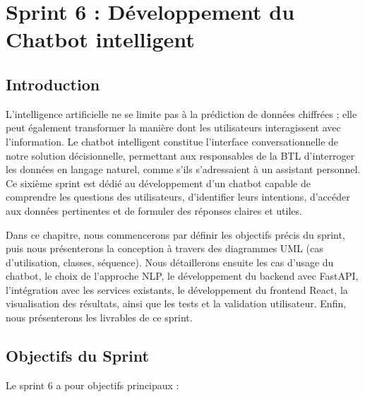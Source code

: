 \chapter{Sprint 6 : Développement du Chatbot intelligent}
\label{chap:sprint6-chatbot}

\section*{Introduction}

L'intelligence artificielle ne se limite pas à la prédiction de données chiffrées ; elle peut également transformer la manière dont les utilisateurs interagissent avec l'information. Le chatbot intelligent constitue l'interface conversationnelle de notre solution décisionnelle, permettant aux responsables de la BTL d'interroger les données en langage naturel, comme s'ils s'adressaient à un assistant personnel. Ce sixième sprint est dédié au développement d'un chatbot capable de comprendre les questions des utilisateurs, d'identifier leurs intentions, d'accéder aux données pertinentes et de formuler des réponses claires et utiles.

Dans ce chapitre, nous commencerons par définir les objectifs précis du sprint, puis nous présenterons la conception à travers des diagrammes UML (cas d'utilisation, classes, séquence). Nous détaillerons ensuite les cas d'usage du chatbot, le choix de l'approche NLP, le développement du backend avec FastAPI, l'intégration avec les services existants, le développement du frontend React, la visualisation des résultats, ainsi que les tests et la validation utilisateur. Enfin, nous présenterons les livrables de ce sprint.

\section{Objectifs du Sprint}
\label{sec:sprint6-objectifs}

Le sprint 6 a pour objectifs principaux :


